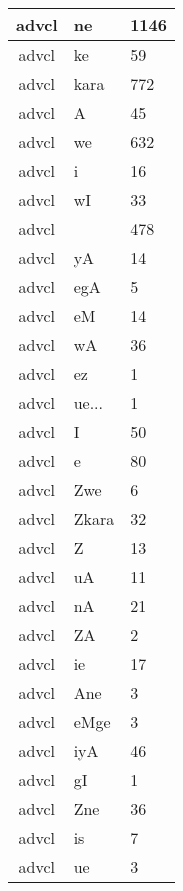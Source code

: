 \documentclass[a4 paper]{article}
\begin{document}
\begin{longtable}{cp{}p{}}
advcl & ne & 1146\\ \midrule advcl & ke & 59\\ \midrule advcl & kara & 772\\ \midrule advcl & A & 45\\ \midrule advcl & we & 632\\ \midrule advcl & i & 16\\ \midrule advcl & wI & 33\\ \midrule advcl &  & 478\\ \midrule advcl & yA & 14\\ \midrule advcl & egA & 5\\ \midrule advcl & eM & 14\\ \midrule advcl & wA & 36\\ \midrule advcl & ez & 1\\ \midrule advcl & ue... & 1\\ \midrule advcl & I & 50\\ \midrule advcl & e & 80\\ \midrule advcl & Zwe & 6\\ \midrule advcl & Zkara & 32\\ \midrule advcl & Z & 13\\ \midrule advcl & uA & 11\\ \midrule advcl & nA & 21\\ \midrule advcl & ZA & 2\\ \midrule advcl & ie & 17\\ \midrule advcl & Ane & 3\\ \midrule advcl & eMge & 3\\ \midrule advcl & iyA & 46\\ \midrule advcl & gI & 1\\ \midrule advcl & Zne & 36\\ \midrule advcl & is & 7\\ \midrule advcl & ue & 3
\end{longtable}
\end{document}
